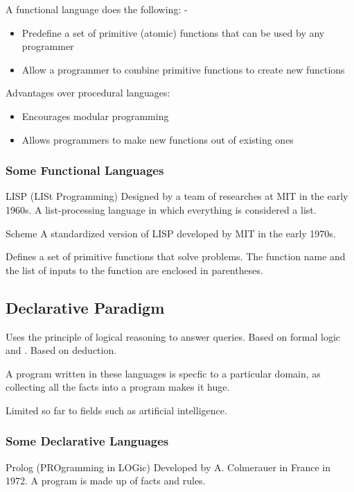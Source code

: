 \documentclass[\main/notes.tex]{subfiles}
\begin{document}
				A functional language does the following:
				\kern-\parskip\begin{itemize}[nosep]
					\item Predefine a set of primitive (atomic) functions that can be used by any programmer
					\item Allow a programmer to combine primitive functions to create new functions
				\end{itemize}

				Advantages over procedural languages:
				\begin{itemize}[nosep]
					\item Encourages modular programming
					\item Allows programmers to make new functions out of existing ones
				\end{itemize}

				\subsubsection{Some Functional Languages}
					\begin{definition}{LISP (LISt Programming)}
						Designed by a team of researches at MIT in the early 1960s. A list-processing language in which everything is considered a list.
					\end{definition}
					\begin{definition}{Scheme}
						A standardized version of LISP developed by MIT in the early 1970s.

						Defines a set of primitive functions that solve problems. The function name and the list of inputs to the function are enclosed in parentheses. 
					\end{definition}
				\subsection{Declarative Paradigm}
					Uses the principle of logical reasoning to answer queries. Based on formal logic and . Based on deduction.

					A program written in these languages is specfic to a particular domain, as collecting all the facts into a program makes it huge.

					Limited so far to fields such as artificial intelligence.
					\subsubsection{Some Declarative Languages}
						\begin{definition}{Prolog (PROgramming in LOGic)}
							Developed by A. Colmerauer in France in 1972. A program is made up of facts and rules.
						\end{definition}
\end{document}
